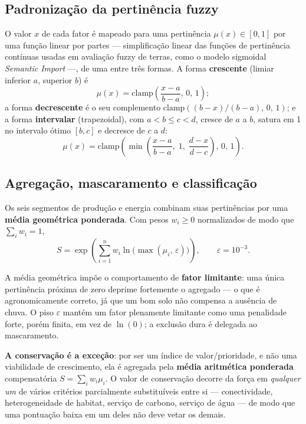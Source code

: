\subsection{Padronização da pertinência fuzzy}\label{sec:fuzzy-standard}

O valor $x$ de cada fator é mapeado para uma pertinência $\mu(x) \in [0,1]$ por uma função linear por
partes --- simplificação linear das funções de pertinência contínuas usadas em avaliação fuzzy de
terras, como o modelo sigmoidal \emph{Semantic Import} \citep[pp.~80--83]{yaghmaeian_mahabadi_land_2012}
---, de uma entre três formas. A forma \textbf{crescente} (limiar inferior
$a$, superior $b$) é
\begin{equation*}
  \mu(x) = \mathrm{clamp}\!\left(\frac{x-a}{b-a},\, 0,\, 1\right);
\end{equation*}
a forma \textbf{decrescente} é o seu complemento $\mathrm{clamp}((b-x)/(b-a),\, 0,\, 1)$; e a forma
\textbf{intervalar} (trapezoidal), com $a < b \le c < d$, cresce de $a$ a $b$, satura em 1 no
intervalo ótimo $[b,c]$ e decresce de $c$ a $d$:
\begin{equation*}
  \mu(x) = \mathrm{clamp}\!\left(\min\!\left(\frac{x-a}{b-a},\; 1,\; \frac{d-x}{d-c}\right),\, 0,\, 1\right).
\end{equation*}

\subsection{Agregação, mascaramento e classificação}\label{sec:aggregation}

Os seis segmentos de produção e energia combinam suas pertinências por uma \textbf{média geométrica
ponderada}. Com pesos $w_i \ge 0$ normalizados de modo que $\sum_i w_i = 1$,
\begin{equation*}
  S = \exp\!\left(\sum_{i=1}^{n} w_i \ln\!\big(\max(\mu_i,\,\varepsilon)\big)\right),
   \qquad \varepsilon = 10^{-3}.
\end{equation*}

A média geométrica impõe o comportamento de \textbf{fator limitante}: uma única pertinência próxima
de zero deprime fortemente o agregado --- o que é agronomicamente correto, já que um bom solo não
compensa a ausência de chuva. O piso $\varepsilon$ mantém um fator plenamente limitante como uma
penalidade forte, porém finita, em vez de $\ln(0)$; a exclusão dura é delegada ao mascaramento.

\textbf{A conservação é a exceção}: por ser um índice de valor/prioridade, e não uma viabilidade de
crescimento, ela é agregada pela \textbf{média aritmética ponderada} compensatória
$S = \sum_i w_i \mu_i$. O valor de conservação decorre da força em \emph{qualquer um} de vários
critérios parcialmente substituíveis entre si --- conectividade, heterogeneidade de habitat, serviço
de carbono, serviço de água --- de modo que uma pontuação baixa em um deles não deve vetar os demais.

